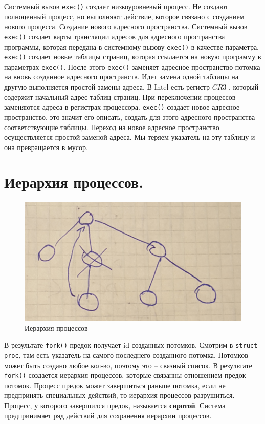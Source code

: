 Системный вызов \verb|exec()| создает низкоуровневый процесс.  Не создают полноценный процесс, но выполняют действие, которое связано с созданием нового процесса. Создание нового адресного пространства. Системный вызов \verb|exec()| создает карты трансляции адресов для адресного пространства программы, которая передана в системному вызову \verb|exec()| в качестве параметра.  \verb|exec()| создает новые таблицы страниц, которая ссылается на новую программу в параметрах \verb|exec()|. После этого \verb|exec()| заменяет адресное пространство потомка на вновь созданное адресного пространств. Идет замена одной таблицы на другую выполняется простой замены адреса. В Intel есть регистр $CR3$ , который содержит начальный адрес таблиц страниц. При переключении процессов заменяются адреса в регистрах процессора. \verb|exec()| создает новое адресное пространство, это значит его описать, создать для этого адресного пространства соответствующие таблицы. Переход на новое адресное пространство осуществляется простой заменой адреса. Мы теряем указатель на эту таблицу и она превращается в мусор. 

\section{Иерархия процессов.}

\begin{figure}[H]
	\centering
	\includegraphics[width=\textwidth]{pic/3.png}
	\caption{Иерархия процессов}
\end{figure}

В результате \verb|fork()| предок получает id созданных потомков. Смотрим в \verb|struct proc|, там есть указатель на самого последнего созданного потомка. Потомков может быть создано любое кол-во, поэтому это – связный список. В результате \verb|fork()| создается иерархия процессов, которые связанны отношением предок – потомок. Процесс предок может завершиться раньше потомка, если не предпринять специальных действий, то иерархия процессов разрушиться. Процесс, у которого завершился предок, называется \textbf{сиротой}. Система предпринимает ряд действий для сохранения иерархии процессов. 

